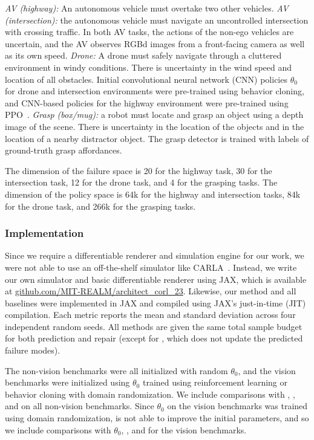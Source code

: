 \textit{AV (highway):} An autonomous vehicle must overtake two other vehicles.
%
\textit{AV (intersection):} the autonomous vehicle must navigate an uncontrolled intersection with crossing traffic.
%
In both AV tasks, the actions of the non-ego vehicles are uncertain, and the AV observes RGBd images from a front-facing camera as well as its own speed.
%
\textit{Drone:} A drone must safely navigate through a cluttered environment in windy conditions. There is uncertainty in the wind speed and location of all obstacles.
%
Initial convolutional neural network (CNN) policies $\theta_0$ for drone and intersection environments were pre-trained using behavior cloning, and CNN-based policies for the highway environment were pre-trained using PPO~\cite{schulmanProximalPolicyOptimization2017}.
%
\textit{Grasp (box/mug): } a robot must locate and grasp an object using a depth image of the scene. There is uncertainty in the location of the objects and in the location of a nearby distractor object. The grasp detector is trained with labels of ground-truth grasp affordances.

The dimension of the failure space is 20 for the highway task, 30 for the intersection task, 12 for the drone task, and 4 for the grasping tasks. The dimension of the policy space is 64k for the highway and intersection tasks, 84k for the drone task, and 266k for the grasping tasks.

\subsubsection{Implementation}

Since we require a differentiable renderer and simulation engine for our work, we were not able to use an off-the-shelf simulator like CARLA~\cite{Dosovitskiy17}. Instead, we write our own simulator and basic differentiable renderer using JAX, which is available at \url{github.com/MIT-REALM/architect_corl_23}.
%
Likewise, our method and all baselines were implemented in JAX and compiled using JAX's just-in-time (JIT) compilation. Each metric reports the mean and standard deviation across four independent random seeds. All methods are given the same total sample budget for both prediction and repair (except for \gdr, which does not update the predicted failure modes).

The non-vision benchmarks were all initialized with random $\theta_0$, and the vision benchmarks were initialized using $\theta_0$ trained using reinforcement learning or behavior cloning with domain randomization. We include comparisons with \gdr, \gda, and \ltc{} on all non-vision benchmarks. Since $\theta_0$ on the vision benchmarks was trained using domain randomization, \gdr{} is not able to improve the initial parameters, and so we include comparisons with $\theta_0$, \gda, and \ltc{} for the vision benchmarks.

